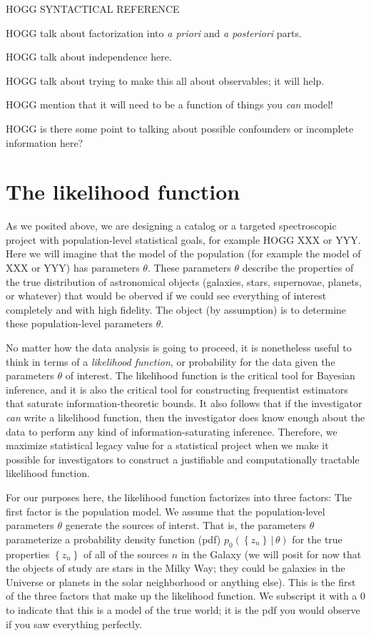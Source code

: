 \documentclass[modern]{aastex62}
\newcommand{\given}{\,|\,}
\newcommand{\set}[1]{\left\{{#1}\right\}}
\newcommand{\foreign}[1]{\textsl{#1}}
\begin{document}
HOGG SYNTACTICAL REFERENCE

HOGG talk about factorization into \foreign{a priori} and \foreign{a posteriori} parts.

HOGG talk about independence here.

HOGG talk about trying to make this all about observables; it will help.

HOGG mention that it will need to be a function of things you \emph{can} model!

HOGG is there some point to talking about possible confounders or incomplete information here?

\section{The likelihood function}\label{sec:lf}

As we posited above, we are designing a catalog or a targeted
spectroscopic project
with population-level statistical goals, for example HOGG XXX or YYY.
Here we will imagine that the model of the population (for example the model
of XXX or YYY) has parameters $\theta$.
These parameters $\theta$ describe the properties of the true distribution
of astronomical objects (galaxies, stars, supernovae, planets, or whatever)
that would be oberved if we could see everything of interest completely and
with high fidelity.
The object (by assumption) is to determine these population-level parameters
$\theta$.

No matter how the data analysis is going to proceed, it is nonetheless
useful to think in
terms of a \emph{likelihood function}, or probability for the data given
the parameters $\theta$ of interest.
The likelihood function is the critical tool for Bayesian inference, and
it is also the critical tool for constructing frequentist estimators that
saturate information-theoretic bounds.
It also follows that if the investigator \emph{can} write a likelihood
function, then the investigator does know enough about the data to perform
any kind of information-saturating inference.
Therefore, we maximize statistical legacy value for a statistical project
when we make it possible for investigators to construct a justifiable and
computationally tractable likelihood function.

For our purposes here, the likelihood function factorizes into three
factors:
The first factor is the population model.
We assume that the population-level parameters $\theta$ generate the
sources of interst.
That is, the parameters $\theta$ parameterize a probability density
function (pdf) $p_0(\set{z_n}\given\theta)$
for the true properties $\set{z_n}$ of all of the sources $n$
in the Galaxy (we will posit for now that the objects of study are
stars in the Milky Way; they could be galaxies in the Universe or
planets in the solar neighborhood or anything else).
This is the first of the three factors that make up the likelihood
function.
We subscript it with a $0$ to indicate that
this is a model of the true world;
it is the pdf you would observe if you saw everything perfectly.
\end{document}
